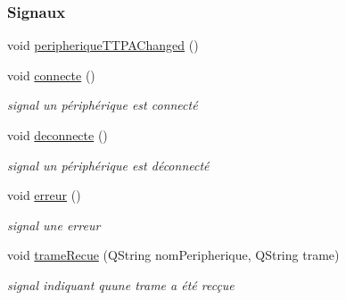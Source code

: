 \subsubsection*{Signaux}
\begin{DoxyCompactItemize}
\item 
void \hyperlink{class_peripherique_t_t_p_a_a5a0a18d25ab4c4b8362a80f215dbfc75}{peripherique\+T\+T\+P\+A\+Changed} ()
\item 
void \hyperlink{class_peripherique_t_t_p_a_ae95f1fe6bb1908b5eb2d34a469f7f873}{connecte} ()
\begin{DoxyCompactList}\small\item\em signal un périphérique est connecté \end{DoxyCompactList}\item 
void \hyperlink{class_peripherique_t_t_p_a_a8cb56776db43953cceb04e5f3ee4ca7b}{deconnecte} ()
\begin{DoxyCompactList}\small\item\em signal un périphérique est déconnecté \end{DoxyCompactList}\item 
void \hyperlink{class_peripherique_t_t_p_a_a7a31d9f923cc71a42d0dab80d9332eb6}{erreur} ()
\begin{DoxyCompactList}\small\item\em signal une erreur \end{DoxyCompactList}\item 
void \hyperlink{class_peripherique_t_t_p_a_aaa8699b83c9659c874a0d066ea633e45}{trame\+Recue} (Q\+String nom\+Peripherique, Q\+String trame)
\begin{DoxyCompactList}\small\item\em signal indiquant qu\textquotesingle{}une trame a été recçue \end{DoxyCompactList}\end{DoxyCompactItemize}

